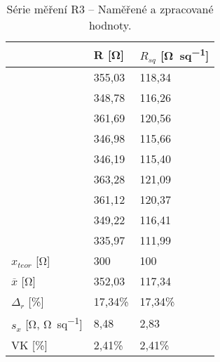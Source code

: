 \begin{table}[h!]
    \caption{Série měření R3 -- Naměřené a zpracované hodnoty.}
    \centering
    \def\arraystretch{1.4}
    \begin{tabular}{l|l|l}
                                                      & R [\unit{\ohm}]    & \(R_{sq}\) [\unit{\ohm\per sq}]  \\ \hline\hline
                                                      & 355,03 & 118,34 \\ \hline
                                                      & 348,78 & 116,26 \\ \hline
                                                      & 361,69 & 120,56 \\ \hline
                                                      & 346,98 & 115,66 \\ \hline
                                                      & 346,19 & 115,40 \\ \hline
                                                      & 363,28 & 121,09 \\ \hline
                                                      & 361,12 & 120,37 \\ \hline
                                                      & 349,22 & 116,41 \\ \hline
                                                      & 335,97 & 111,99 \\ \hline\hline
        \(x_{teor} \) [\unit{\ohm}]                   & 300    & 100    \\ \hline
        \(\overline{x} \) [\unit{\ohm}]               & 352,03 & 117,34 \\ \hline
        \(\Delta_{r} \) [\unit{\percent}]             & 17,34\%& 17,34\%\\ \hline\hline
        \(s_{x} \) [\unit{\ohm}, \unit{\ohm\per sq}]  & 8,48   & 2,83   \\ \hline
        VK [\unit{\percent}]                          & 2,41\% & 2,41\% \\ 
    \end{tabular}
    \label{tab:r3_hodnoty}
\end{table}

